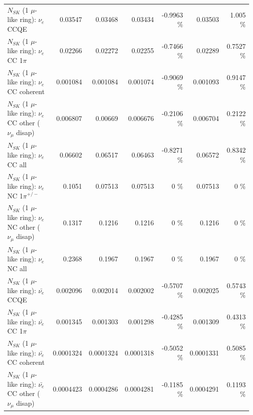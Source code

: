 \begin{table}
\begin{tabular}{| l | r | r | r  r | r  r |}
\hline
\hline
\hline
                                      $N_{SK}$ (1 $\mu$-like ring): $\nu_e$ CCQE &         0.03547 &         0.03468 &         0.03434 &  -0.9963 \%  &         0.03503 &    1.005 \%  \\ 
                                 $N_{SK}$ (1 $\mu$-like ring): $\nu_e$ CC 1$\pi$ &         0.02266 &         0.02272 &         0.02255 &  -0.7466 \%  &         0.02289 &   0.7527 \%  \\ 
                               $N_{SK}$ (1 $\mu$-like ring): $\nu_e$ CC coherent &        0.001084 &        0.001084 &        0.001074 &  -0.9069 \%  &        0.001093 &   0.9147 \%  \\ 
                $N_{SK}$ (1 $\mu$-like ring): $\nu_e$ CC other ($\nu_\mu$ disap) &        0.006807 &         0.00669 &        0.006676 &  -0.2106 \%  &        0.006704 &   0.2122 \%  \\ 
                                  $N_{SK}$ (1 $\mu$-like ring): $\nu_{e}$ CC all &         0.06602 &         0.06517 &         0.06463 &  -0.8271 \%  &         0.06572 &   0.8342 \%  \\ 
\hline
                           $N_{SK}$ (1 $\mu$-like ring): $\nu_e$ NC 1$\pi^{+/-}$ &          0.1051 &         0.07513 &         0.07513 &        0 \%  &         0.07513 &        0 \%  \\ 
                $N_{SK}$ (1 $\mu$-like ring): $\nu_e$ NC other ($\nu_\mu$ disap) &          0.1317 &          0.1216 &          0.1216 &        0 \%  &          0.1216 &        0 \%  \\ 
                                  $N_{SK}$ (1 $\mu$-like ring): $\nu_{e}$ NC all &          0.2368 &          0.1967 &          0.1967 &        0 \%  &          0.1967 &        0 \%  \\ 
\hline
\hline
\hline
                                $N_{SK}$ (1 $\mu$-like ring): $\bar{\nu_e}$ CCQE &        0.002096 &        0.002014 &        0.002002 &  -0.5707 \%  &        0.002025 &   0.5743 \%  \\ 
                           $N_{SK}$ (1 $\mu$-like ring): $\bar{\nu_e}$ CC 1$\pi$ &        0.001345 &        0.001303 &        0.001298 &  -0.4285 \%  &        0.001309 &   0.4313 \%  \\ 
                         $N_{SK}$ (1 $\mu$-like ring): $\bar{\nu_e}$ CC coherent &       0.0001324 &       0.0001324 &       0.0001318 &  -0.5052 \%  &       0.0001331 &   0.5085 \%  \\ 
          $N_{SK}$ (1 $\mu$-like ring): $\bar{\nu_e}$ CC other ($\nu_\mu$ disap) &       0.0004423 &       0.0004286 &       0.0004281 &  -0.1185 \%  &       0.0004291 &   0.1193 \%  \\ 

\end{tabular}
\end{table}
